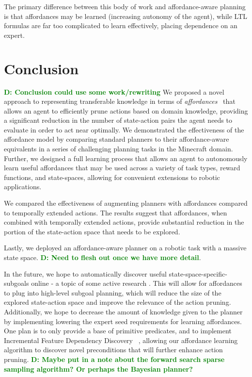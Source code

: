 \documentclass[conference]{IEEEtran}
\newcommand{\dnote}[1]{\textcolor{Green}{\textbf{D: #1}}}
\begin{document}
The primary difference between this body of work and affordance-aware planning is that affordances may be learned (increasing autonomy of the agent), while LTL formulas are far too complicated to learn effectively, placing dependence on an expert.

\section{Conclusion}
\label{sec:conclusion}
\dnote{Conclusion could use some work/rewriting}
We proposed a novel approach to representing transferable knowledge in terms of
{\em affordances}~\cite{gibson77} that allows an agent to efficiently prune actions 
based on domain knowledge, providing a significant reduction in the number of state-action
pairs the agent needs to evaluate in order to act near optimally. We demonstrated the 
effectiveness of the affordance model by comparing standard planners to their affordance-aware
equivalents in a series of challenging planning tasks in the Minecraft domain. Further, we designed
a full learning process that allows an agent to autonomously learn useful affordances that may be used
across a variety of task types, reward functions, and state-spaces, allowing for convenient extensions 
to robotic applications.

We compared the effectiveness of augmenting planners with affordances compared to 
temporally extended actions. The results suggest that affordances, when combined with 
temporally extended actions, provide substantial reduction in the portion of the state-action 
space that needs to be explored.

Lastly, we deployed an affordance-aware planner on a robotic task with a massive 
state space. \dnote{Need to flesh out once we have more detail}.

In the future, we hope to automatically discover useful state-space-specific-subgoals online 
- a topic of some active research \cite{Mcgovern01automaticdiscovery,Simsek:2005:IUS:1102351.1102454}.
This will allow for affordances to plug into high-level subgoal planning, which will reduce the size of the 
explored state-action space and improve the relevance of the action pruning. Additionally, we hope to 
decrease the amount of knowledge given to the planner by implementing lowering the expert seed 
requirements for learning affordances. One plan is to only provide a base of primitive predicates, and 
to implement Incremental Feature Dependency Discovery ~\cite{ICML2011Geramifard_473}, allowing 
our affordance learning algorithm to discover novel preconditions that will further enhance action pruning.
\dnote{Maybe put in a note about the forward search sparse sampling algorithm? Or perhaps the Bayesian planner?}

{\small


}
\end{document}
